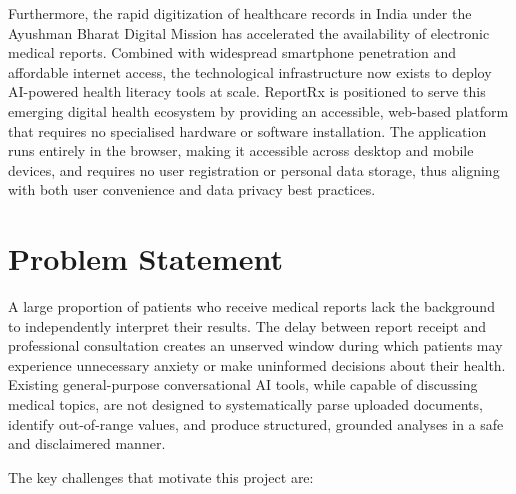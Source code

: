 \documentclass[12pt,a4paper]{report}
\begin{document}
Furthermore, the rapid digitization of healthcare records in India under the Ayushman Bharat Digital Mission has accelerated the availability of electronic medical reports. Combined with widespread smartphone penetration and affordable internet access, the technological infrastructure now exists to deploy AI-powered health literacy tools at scale. ReportRx is positioned to serve this emerging digital health ecosystem by providing an accessible, web-based platform that requires no specialised hardware or software installation. The application runs entirely in the browser, making it accessible across desktop and mobile devices, and requires no user registration or personal data storage, thus aligning with both user convenience and data privacy best practices.

\section{Problem Statement}
A large proportion of patients who receive medical reports lack the background to independently interpret their results. The delay between report receipt and professional consultation creates an unserved window during which patients may experience unnecessary anxiety or make uninformed decisions about their health. Existing general-purpose conversational AI tools, while capable of discussing medical topics, are not designed to systematically parse uploaded documents, identify out-of-range values, and produce structured, grounded analyses in a safe and disclaimered manner.

The key challenges that motivate this project are:
\end{document}
